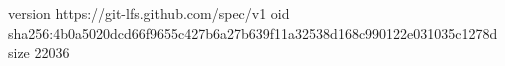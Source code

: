 version https://git-lfs.github.com/spec/v1
oid sha256:4b0a5020dcd66f9655c427b6a27b639f11a32538d168c990122e031035c1278d
size 22036
